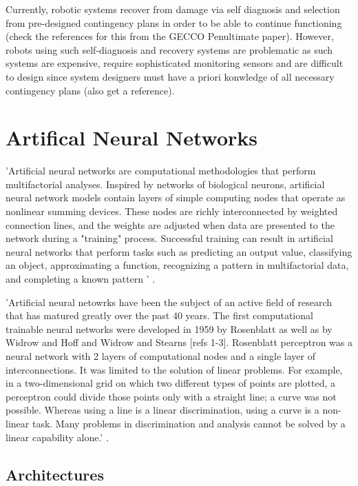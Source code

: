 Currently, robotic systems recover from damage via self diagnosis and selection from pre-designed contingency plans in order to be able to continue functioning (check the references for this from the GECCO Penultimate paper). However, robots using such self-diagnosis and recovery systems are problematic as such systems are expensive, require sophisticated monitoring sensors and are difficult to design since system designers must have a priori konwledge of all necessary contingency plans (also get a reference).


\section{Artifical Neural Networks}

'Artificial neural networks are computational methodologies that perform multifactorial analyses. Inspired by networks of biological neurons, artificial neural network models contain layers of simple computing nodes that operate as nonlinear summing devices. These nodes are richly interconnected by weighted connection lines, and the weights are adjusted when data are presented to the network during a "training" process. Successful training can result in artificial neural networks that perform tasks such as predicting an output value, classifying an object, approximating a function, recognizing a pattern in multifactorial data, and completing a known pattern ' \cite{dayhoff2001artificial}.

'Artificial neural netowrks have been the subject of an active field of research that has matured greatly over the past 40 years. The first computational trainable neural networks were developed in 1959 by Rosenblatt as well as by Widrow and Hoff and Widrow and Stearns [refs 1-3]. Rosenblatt perceptron was a neural network with 2 layers of computational nodes and a single layer of interconnections. It was limited to the solution of linear problems. For example, in a two-dimensional grid on which two different types of points are plotted, a perceptron could divide those points only with a straight line; a curve was not possible. Whereas using a line is a linear discrimination, using a curve is a non-linear task. Many problems in discrimination and analysis cannot be solved by a linear capability alone.' \cite{dayhoff2001artificial}.

\subsection{Architectures}

